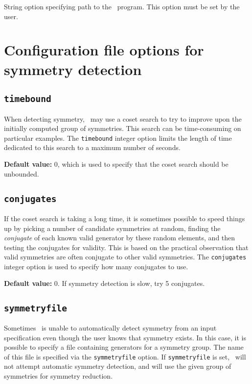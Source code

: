 String option specifying path to the \gap\ program.  This option must be set by the user.

\section{Configuration file options for symmetry detection}

\subsection{\texttt{timebound}}

When detecting symmetry, \topspin\ may use a coset search to try to improve upon the initially computed group of symmetries.  This search
can be time-consuming on particular examples.  The \texttt{timebound} integer option limits the length of time dedicated to this search to a maximum
number of seconds.

\noindent\textbf{Default value: } 0, which is used to specify that the coset search should be unbounded.

\subsection{\texttt{conjugates}}

If the coset search is taking a long time, it is sometimes possible to speed things up by picking a number of candidate symmetries
at random, finding the \emph{conjugate} of each known valid generator by these random elements, and then testing the conjugates for
validity.  This is based on the practical observation that valid symmetries are often conjugate to other valid symmetries.  The
\texttt{conjugates} integer option is used to specify how many conjugates to use.

\noindent\textbf{Default value: } 0.  If symmetry detection is slow, try 5 conjugates.

\subsection{\texttt{symmetryfile}}

Sometimes \topspin\ is unable to automatically detect symmetry from an input specification even though the user knows that symmetry exists.
In this case, it is possible to specify a file containing generators for a symmetry group.  The name of this file is specified via the
\texttt{symmetryfile} option.  If \texttt{symmetryfile} is set, \topspin\ will not attempt automatic symmetry detection, and will use the
given group of symmetries for symmetry reduction.

